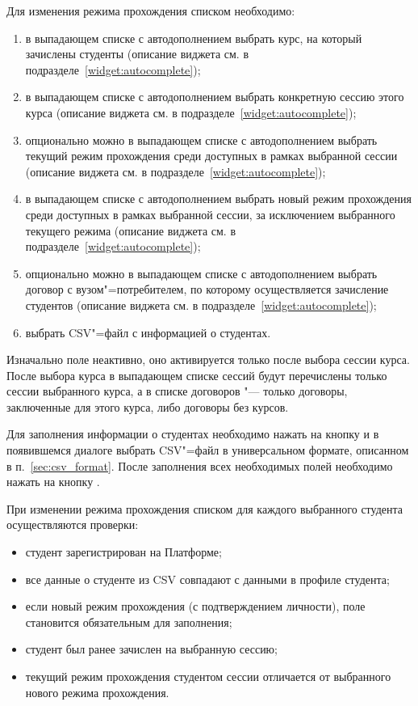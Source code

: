 Для изменения режима прохождения списком необходимо:
\begin{enumerate}
	\item в выпадающем списке с автодополнением выбрать курс, на который зачислены студенты 
	(описание виджета см. в подразделе~\ref{widget:autocomplete});
	\item в выпадающем списке с автодополнением выбрать конкретную сессию этого курса 
	(описание виджета см. в подразделе~\ref{widget:autocomplete});
	\item опционально можно в выпадающем списке с автодополнением выбрать текущий режим прохождения среди 
	доступных в рамках выбранной сессии (описание виджета см. в подразделе~\ref{widget:autocomplete});
	\item в выпадающем списке с автодополнением выбрать новый режим прохождения среди доступных в рамках выбранной 
	сессии, за исключением выбранного текущего режима (описание виджета см. в подразделе~\ref{widget:autocomplete});
	\item опционально можно в выпадающем списке с автодополнением выбрать договор с вузом"=потребителем, 
	по которому осуществляется зачисление студентов (описание виджета см. в подразделе~\ref{widget:autocomplete});
	\item выбрать CSV"=файл с информацией о студентах. 
\end{enumerate}

Изначально поле  неактивно, оно активируется только после выбора сессии курса.
После выбора курса в выпадающем списке сессий будут перечислены только сессии выбранного курса, 
а в списке договоров "--- только договоры, заключенные для этого курса, либо договоры без курсов.

Для заполнения информации о студентах необходимо нажать на кнопку  и в появившемся диалоге выбрать 
CSV"=файл в универсальном формате, описанном в п.~\ref{sec:csv_format}. 
После заполнения всех необходимых полей необходимо нажать на кнопку .

При изменении режима прохождения списком для каждого выбранного студента осуществляются проверки:
\begin{itemize}
	\item студент зарегистрирован на Платформе;
	\item все данные о студенте из CSV совпадают с данными в профиле студента;
	\item если новый режим прохождения  (с подтверждением личности), поле  
	становится обязательным для заполнения;
	\item студент был ранее зачислен на выбранную сессию;
	\item текущий режим прохождения студентом сессии отличается от выбранного нового режима прохождения.
\end{itemize}

